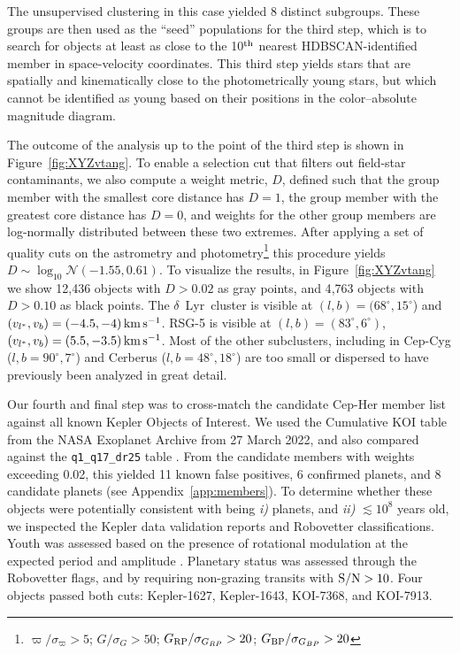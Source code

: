 \documentclass[12pt,twocolumn,tighten,linenumbers]{aastex63}
\newcommand{\mkms}{{\rm \,km\,s^{-1}}}  %
\begin{document}
The unsupervised clustering in this case yielded 8 distinct subgroups.
These groups are then used as the ``seed'' populations for the third
step, which is to search for objects at least as close to the 10$^{\rm
th}$ nearest HDBSCAN-identified member in space-velocity coordinates.
This third step yields stars that are spatially and kinematically
close to the photometrically young stars, but which cannot be
identified as young based on their positions in the color--absolute
magnitude diagram.

The outcome of the analysis up to the point of the third step is shown
in Figure~\ref{fig:XYZvtang}.  To enable a selection cut that filters
out field-star contaminants, we also compute a weight metric,
$D$, defined such that the group member with the smallest core
distance has $D=1$, the group member with the greatest core
distance has $D=0$, and weights for the other group members are
log-normally distributed between these two extremes.  After applying a
set of quality cuts on the astrometry and
photometry\footnote{$\varpi/\sigma_\varpi>5$; $G/\sigma_{G}>50$;
$G_{\rm RP}/\sigma_{G_{RP}}>20$; $G_{\rm BP}/\sigma_{G_{BP}}>20$}
this procedure yields $D \sim \log_{10}\mathcal{N}(-1.55,0.61)$.
To visualize the results, in Figure~\ref{fig:XYZvtang} we show
12{,}436 objects with $D>0.02$ as gray points, and 
4{,}763 objects with $D>0.10$ as black points.   The
$\delta$~Lyr\ cluster is visible at $(l,b)=(68^\circ,15^\circ$) and $(v_{l^*},
v_b)=(-4.5 ,-4 )\mkms$.  RSG-5 is visible at $(l,b)=(83^\circ,6^\circ)$,
$(v_{l^*}, v_b)=(5.5 ,-3.5 )\mkms$.  Most of the other subclusters, including
in Cep-Cyg ($l,b=90^\circ,7^\circ$) and Cerberus ($l,b=48^\circ,18^\circ$) are
too small or dispersed to have previously been analyzed in great detail.

%
%
Our fourth and final step was to cross-match the candidate Cep-Her
member list against all known Kepler Objects of Interest.  We used the
Cumulative KOI table from the NASA Exoplanet Archive from 27 March
2022, and also compared against the \texttt{q1\_q17\_dr25} table
\citep{thompson_planetary_2018}.  From the candidate members with
weights exceeding 0.02, this yielded 11 known false positives, 6
confirmed planets, and 8 candidate planets (see Appendix~\ref{app:members}).
To determine whether these objects were
potentially consistent with being {\it i)} planets, and {\it ii)}
$\lesssim 10^8$ years old, we inspected the Kepler data validation
reports and Robovetter classifications.  Youth was assessed based on
the presence of rotational modulation at the expected period and
amplitude  \citep[{e.g.},][]{rebull_rotation_2020}. 
Planetary status was assessed through the Robovetter flags, and by
requiring non-grazing transits with ${\rm S/N}>10$.
Four objects passed both cuts: Kepler-1627, Kepler-1643, KOI-7368, and
KOI-7913.
\end{document}
